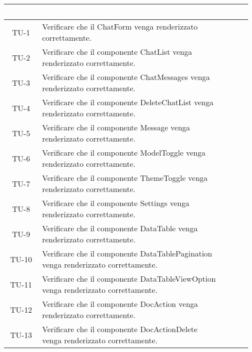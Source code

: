 \begingroup
\setlength{\tabcolsep}{10pt}
\renewcommand{\arraystretch}{1.5}
\begin{xltabular}{\textwidth}{| c | X | c |}
    \hline
     \textbf{\textcolor{white}{Codice}} & \textbf{\textcolor{white}{Descrizione}} & \textbf{\textcolor{white}{Stato}}\\
    \hline
    \endhead
    TU-1 & Verificare che il  ChatForm venga renderizzato correttamente. & \textcolor{cmarkcolor}{} \\
    \hline
    TU-2 & Verificare che il componente ChatList venga renderizzato correttamente. & \textcolor{cmarkcolor}{} \\
    \hline
    TU-3 & Verificare che il componente ChatMessages venga renderizzato correttamente. & \textcolor{cmarkcolor}{} \\
    \hline
    TU-4 & Verificare che il componente DeleteChatList venga renderizzato correttamente. & \textcolor{cmarkcolor}{} \\
    \hline
    TU-5 & Verificare che il componente Message venga renderizzato correttamente. & \textcolor{cmarkcolor}{} \\
    \hline
    TU-6 & Verificare che il componente ModelToggle venga renderizzato correttamente. & \textcolor{cmarkcolor}{} \\
    \hline
    TU-7 & Verificare che il componente ThemeToggle venga renderizzato correttamente. & \textcolor{cmarkcolor}{} \\
    \hline
    TU-8 & Verificare che il componente Settings venga renderizzato correttamente. & \textcolor{cmarkcolor}{} \\
    \hline
    TU-9 & Verificare che il componente DataTable venga renderizzato correttamente. & \textcolor{cmarkcolor}{} \\
    \hline
    TU-10 & Verificare che il componente DataTablePagination venga renderizzato correttamente. & \textcolor{cmarkcolor}{} \\
    \hline
    TU-11 & Verificare che il componente DataTableViewOption venga renderizzato correttamente. & \textcolor{cmarkcolor}{} \\
    \hline
    TU-12 & Verificare che il componente DocAction venga renderizzato correttamente. & \textcolor{cmarkcolor}{} \\
    \hline
    TU-13 & Verificare che il componente DocActionDelete venga renderizzato correttamente. & \textcolor{cmarkcolor}{} \\

\end{xltabular}
